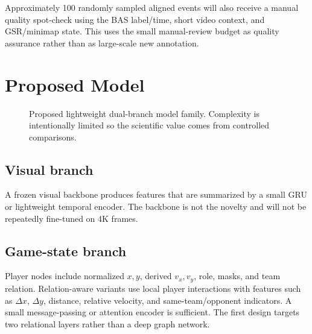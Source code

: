 \documentclass[11pt,a4paper]{article}
\begin{document}
Approximately 100 randomly sampled aligned events will also receive a manual quality spot-check using the BAS label/time, short video context, and GSR/minimap state. This uses the small manual-review budget as quality assurance rather than as large-scale new annotation.

\section{Proposed Model}
\begin{figure}[H]
\centering
{}
\caption{Proposed lightweight dual-branch model family. Complexity is intentionally limited so the scientific value comes from controlled comparisons.}
\end{figure}

\subsection{Visual branch}
A frozen visual backbone produces features that are summarized by a small GRU or lightweight temporal encoder. The backbone is not the novelty and will not be repeatedly fine-tuned on 4K frames.

\subsection{Game-state branch}
Player nodes include normalized $x,y$, derived $v_x,v_y$, role, masks, and team relation. Relation-aware variants use local player interactions with features such as $\Delta x$, $\Delta y$, distance, relative velocity, and same-team/opponent indicators. A small message-passing or attention encoder is sufficient. The first design targets two relational layers rather than a deep graph network.
\end{document}
